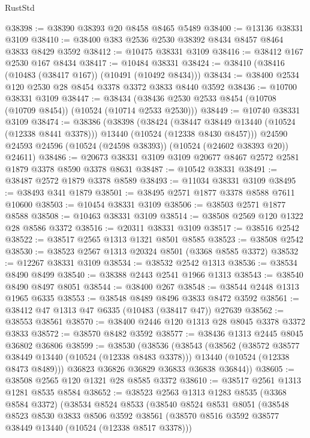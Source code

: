 \begin{lexlean}{RustStd}
\begin{coremodule}
@38398 := @38390 @38393 @20 @8458 @8465 @5489
@38400 := @13136 @38331 @3109
@38410 := @38400 @383 @2536 @2530 @38392 @8434 @8457 @8464 @3833 @8429 @3592
@38412 := @10475 @38331 @3109
@38416 := @38412 @167 @2530 @167 @8434
@38417 := @10484 @38331
@38424 := @38410 (@38416 (@10483 (@38417 @167)) (@10491 (@10492 @8434)))
@38434 := @38400 @2534 @120 @2530 @28 @8454 @3378 @3372 @3833 @8440 @3592
@38436 := @10700 @38331 @3109
@38447 := @38434 (@38436 @2530 @2533 @8454 (@10708 (@10709 @8454)) (@10524 (@10714 @2533 @2530)))
@38449 := @10740 @38331 @3109
@38474 := @38386
    (@38398
      (@38424
        (@38447 @38449 @13440 (@10524 (@12338 @8441 @3378)))
        @13440
        (@10524 (@12338 @8430 @8457)))
      @24590
      @24593
      @24596
      (@10524 (@24598 @38393))
      (@10524 (@24602 @38393 @20))
      @24611)
@38486 := @20673 @38331 @3109 @3109 @20677 @8467 @2572 @2581 @1879 @3378 @8590 @3378 @8631
@38487 := @10542 @38331
@38491 := @38487 @2572 @1879 @3378 @8589
@38493 := @11034 @38331 @3109
@38495 := @38493 @341 @1879
@38501 := @38495 @2571 @1877 @3378 @8588 @7611 @10600
@38503 := @10454 @38331 @3109
@38506 := @38503 @2571 @1877 @8588
@38508 := @10463 @38331 @3109
@38514 := @38508 @2569 @120 @1322 @28 @8586 @3372
@38516 := @20311 @38331 @3109
@38517 := @38516 @2542
@38522 := @38517 @2565 @1313 @1321 @8501 @8585
@38523 := @38508 @2542
@38530 := @38523 @2567 @1313 @20324 @8501 (@3368 @8585 @3372)
@38532 := @12267 @38331 @3109
@38534 := @38532 @2542 @1313
@38536 := @38534 @8490 @8499
@38540 := @38388 @2443 @2541 @1966 @1313
@38543 := @38540 @8490 @8497 @8051
@38544 := @38400 @267
@38548 := @38544 @2448 @1313 @1965 @6335
@38553 := @38548 @8489 @8496 @3833 @8472 @3592
@38561 := @38412 @47 @1313 @47 @6335 (@10483 (@38417 @47)) @27639
@38562 := @38553 @38561
@38570 := @38400 @2446 @120 @1313 @28 @8045 @3378 @3372 @3833
@38572 := @38570 @8482 @3592
@38577 := @38436 @1313 @2445 @8045 @36802 @36806
@38599 := @38530
    (@38536
      (@38543
        (@38562
          (@38572 @38577 @38449 @13440 (@10524 (@12338 @8483 @3378)))
          @13440
          (@10524 (@12338 @8473 @8489)))
        @36823
        @36826
        @36829
        @36833
        @36838
        @36844))
@38605 := @38508 @2565 @120 @1321 @28 @8585 @3372
@38610 := @38517 @2561 @1313 @1281 @8535 @8584
@38652 := @38523
    @2563
    @1313
    @1283
    @8535
    (@3368 @8584 @3372)
    (@38534
      @8524
      @8533
      (@38540
        @8524
        @8531
        @8051
        (@38548
          @8523
          @8530
          @3833
          @8506
          @3592
          @38561
          (@38570 @8516 @3592 @38577 @38449 @13440 (@10524 (@12338 @8517 @3378)))

\end{coremodule}
\end{lexlean}

